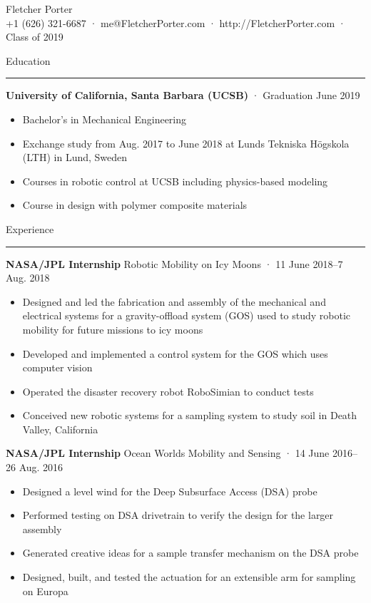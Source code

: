 \documentclass[12pt, oneside]{article}
\newcommand{\titlestyle}[1] {
	{\fontsize{50pt}{1em}\selectfont \textcolor{new_red}{\textsf{#1}}} \\
}
\newcommand{\headingstyleJobs}[1] {
	{\fontsize{19pt}{1em}\selectfont \textcolor{new_red}{\textsf{#1}}}
	\textcolor{new_red}{\rule{3.25in}{0.5pt}} \vspace{3pt}
}
\newcommand{\infostyle}[1] {
	{\fontsize{9pt}{1em}\selectfont #1} \\ \vspace{10pt}
}
\newcommand{\jobtitle}[3] {
	{\bf #1} {#2} · {#3} \vspace{-10pt} \\
}
\begin{document}
\begin{flushleft}



\titlestyle{Fletcher Porter}
\infostyle{+1 (626) 321-6687 · me@FletcherPorter.com · http://FletcherPorter.com · Class of 2019}


\headingstyleJobs{Education}

\jobtitle{University of California, Santa Barbara (UCSB)}{}{Graduation June 2019}
\begin{itemize}
	\item Bachelor's in Mechanical Engineering
	\item Exchange study from Aug. 2017 to June 2018 at Lunds Tekniska Högskola (LTH) in Lund, Sweden
	\item Courses in robotic control at UCSB including physics-based modeling
	\item Course in design with polymer composite materials
\end{itemize}


\headingstyleJobs{Experience}

\jobtitle{NASA/JPL Internship}{Robotic Mobility on Icy Moons}{11 June 2018–7 Aug. 2018}
\begin{itemize}
	\item Designed and led the fabrication and assembly of the mechanical and electrical systems for a gravity-offload system (GOS)  used to study robotic mobility for future missions to icy moons
	\item Developed and implemented a control system for the GOS which uses computer vision
	\item Operated the disaster recovery robot RoboSimian to conduct tests
	\item Conceived new robotic systems for a sampling system to study soil in Death Valley, California
\end{itemize}

\jobtitle{NASA/JPL Internship}{Ocean Worlds Mobility and Sensing}{14 June 2016–26 Aug. 2016}
\def\HrefFont{\em}
\begin{itemize}
	\item Designed a level wind for the Deep Subsurface Access (DSA) probe
	\item Performed testing on DSA drivetrain to verify the design for the larger assembly
	\item Generated creative ideas for a sample transfer mechanism on the DSA probe
	\item Designed, built, and tested the actuation for an extensible arm for sampling on Europa
\end{itemize}


\end{flushleft}
\end{document}
